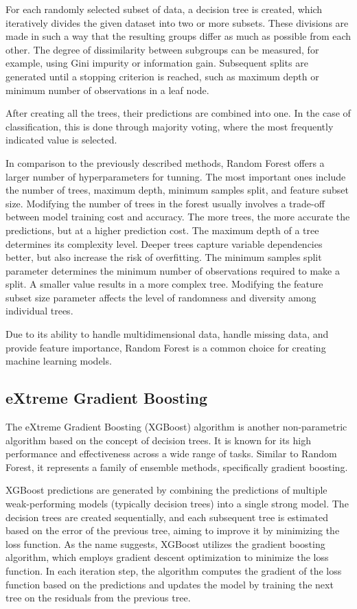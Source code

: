 For each randomly selected subset of data, a decision tree is created, which iteratively divides the given dataset into two or more subsets. These divisions are made in such a way that the resulting groups differ as much as possible from each other. The degree of dissimilarity between subgroups can be measured, for example, using Gini impurity or information gain. Subsequent splits are generated until a stopping criterion is reached, such as maximum depth or minimum number of observations in a leaf node.

After creating all the trees, their predictions are combined into one. In the case of classification, this is done through majority voting, where the most frequently indicated value is selected.

In comparison to the previously described methods, Random Forest offers a larger number of hyperparameters for tunning. The most important ones include the number of trees, maximum depth, minimum samples split, and feature subset size. Modifying the number of trees in the forest usually involves a trade-off between model training cost and accuracy. The more trees, the more accurate the predictions, but at a higher prediction cost. The maximum depth of a tree determines its complexity level. Deeper trees capture variable dependencies better, but also increase the risk of overfitting. The minimum samples split parameter determines the minimum number of observations required to make a split. A smaller value results in a more complex tree. Modifying the feature subset size parameter affects the level of randomness and diversity among individual trees.

Due to its ability to handle multidimensional data, handle missing data, and provide feature importance, Random Forest is a common choice for creating machine learning models.

\subsection{eXtreme Gradient Boosting}
The eXtreme Gradient Boosting (XGBoost) algorithm is another non-parametric algorithm based on the concept of decision trees. It is known for its high performance and effectiveness across a wide range of tasks. Similar to Random Forest, it represents a family of ensemble methods, specifically gradient boosting.

XGBoost predictions are generated by combining the predictions of multiple weak-performing models (typically decision trees) into a single strong model. The decision trees are created sequentially, and each subsequent tree is estimated based on the error of the previous tree, aiming to improve it by minimizing the loss function. As the name suggests, XGBoost utilizes the gradient boosting algorithm, which employs gradient descent optimization to minimize the loss function. In each iteration step, the algorithm computes the gradient of the loss function based on the predictions and updates the model by training the next tree on the residuals from the previous tree.

